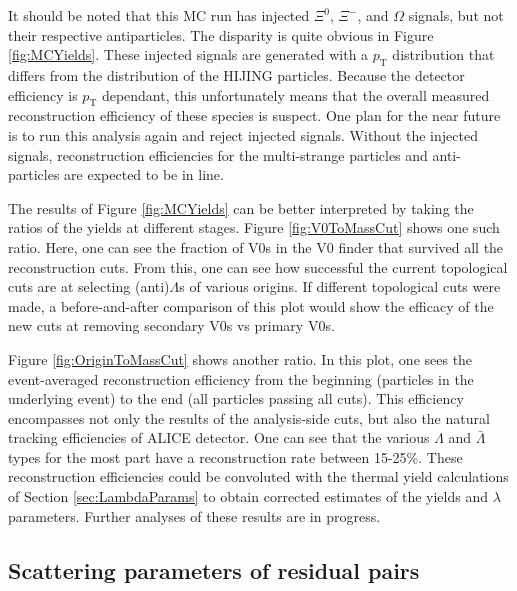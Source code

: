 It should be noted that this MC run has injected $\Xi^0$, $\Xi^-$, and $\Omega$ signals, but not their respective antiparticles.  The disparity is quite obvious in Figure \ref{fig:MCYields}.  These injected signals are generated with a $p_\mathrm{T}$ distribution that differs from the distribution of the HIJING particles.  Because the detector efficiency is $p_\mathrm{T}$ dependant, this unfortunately means that the overall measured reconstruction efficiency of these species is suspect.  One plan for the near future is to run this analysis again and reject injected signals.  Without the injected signals, reconstruction efficiencies for the multi-strange particles and anti-particles are expected to be in line.

The results of Figure \ref{fig:MCYields} can be better interpreted by taking the ratios of the yields at different stages.  Figure \ref{fig:V0ToMassCut} shows one such ratio.  Here, one can see the fraction of V0s in the V0 finder that survived all the reconstruction cuts.  From this, one can see how successful the current topological cuts are at selecting (anti)$\Lambda$s of various origins.   If different topological cuts were made, a before-and-after comparison of this plot would show the efficacy of the new cuts at removing secondary V0s vs primary V0s.

Figure \ref{fig:OriginToMassCut} shows another ratio.  In this plot, one sees the event-averaged reconstruction efficiency from the beginning (particles in the underlying event) to the end (all particles passing all cuts).  This efficiency encompasses not only the results of the analysis-side cuts, but also the natural tracking efficiencies of ALICE detector.  One can see that the various $\Lambda$ and $\bar{\Lambda}$ types for the most part have a reconstruction rate between 15-25\%.  These reconstruction efficiencies could be convoluted with the thermal yield calculations of Section \ref{sec:LambdaParams} to obtain corrected estimates of the yields and $\lambda$ parameters.  Further analyses of these results are in progress.


\subsection{Scattering parameters of residual pairs}
\label{sec:ScatteringParams}

